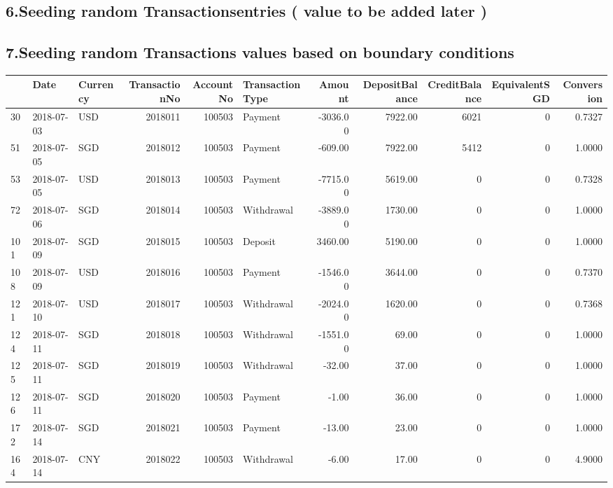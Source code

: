 \documentclass[]{article}
\begin{document}
\subsection{6.Seeding random Transactionsentries ( value to be added
later
)}\label{seeding-random-transactionsentries-value-to-be-added-later}

\subsection{7.Seeding random Transactions values based on boundary
conditions}\label{seeding-random-transactions-values-based-on-boundary-conditions}

\begin{table}[H]
\centering
\begin{tabular}{l|l|l|r|r|l|r|r|r|r|r}
\hline
  & Date & Currency & TransactionNo & AccountNo & TransactionType & Amount & DepositBalance & CreditBalance & EquivalentSGD & Conversion\\
\hline
30 & 2018-07-03 & USD & 2018011 & 100503 & Payment & -3036.00 & 7922.00 & 6021 & 0 & 0.7327\\
\hline
51 & 2018-07-05 & SGD & 2018012 & 100503 & Payment & -609.00 & 7922.00 & 5412 & 0 & 1.0000\\
\hline
53 & 2018-07-05 & USD & 2018013 & 100503 & Payment & -7715.00 & 5619.00 & 0 & 0 & 0.7328\\
\hline
72 & 2018-07-06 & SGD & 2018014 & 100503 & Withdrawal & -3889.00 & 1730.00 & 0 & 0 & 1.0000\\
\hline
101 & 2018-07-09 & SGD & 2018015 & 100503 & Deposit & 3460.00 & 5190.00 & 0 & 0 & 1.0000\\
\hline
108 & 2018-07-09 & USD & 2018016 & 100503 & Payment & -1546.00 & 3644.00 & 0 & 0 & 0.7370\\
\hline
121 & 2018-07-10 & USD & 2018017 & 100503 & Withdrawal & -2024.00 & 1620.00 & 0 & 0 & 0.7368\\
\hline
124 & 2018-07-11 & SGD & 2018018 & 100503 & Withdrawal & -1551.00 & 69.00 & 0 & 0 & 1.0000\\
\hline
125 & 2018-07-11 & SGD & 2018019 & 100503 & Withdrawal & -32.00 & 37.00 & 0 & 0 & 1.0000\\
\hline
126 & 2018-07-11 & SGD & 2018020 & 100503 & Payment & -1.00 & 36.00 & 0 & 0 & 1.0000\\
\hline
172 & 2018-07-14 & SGD & 2018021 & 100503 & Payment & -13.00 & 23.00 & 0 & 0 & 1.0000\\
\hline
164 & 2018-07-14 & CNY & 2018022 & 100503 & Withdrawal & -6.00 & 17.00 & 0 & 0 & 4.9000\\

\end{tabular}
\end{table}
\end{document}
